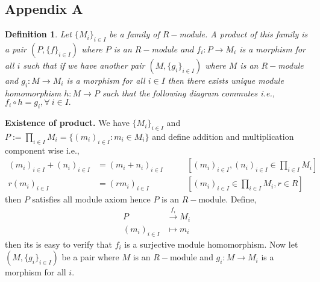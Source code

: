 \documentclass[11pt]{amsart}
\newtheorem{defn}[theorem]{Definition}
\begin{document}
\subsection{Appendix A}
\begin{defn}
Let $\{M_i\}_{i\in I}$ be a family of $R-$module. A product of this family is a pair $(P,\{f\}_{i\in I})$ where $P$ is an $R-$module and $f_i:P\to M_i$ is a morphism for all $i$ such that if we have another pair $(M,\{g_i\}_{i\in I})$ where $M$ is an $R-$module and $g_i:M\to M_i$ is a morphism for all $i\in I$ then there exists unique module homomorphism $h:M\to P$ such that the following diagram commutes i.e., $f_i\circ h=g_i,\forall~i\in I.$
\begin{center}
\end{center}
\end{defn}
\textbf{Existence of product.} We have $\{M_i\}_{i\in I}$ and $P:=\displaystyle\prod_{i\in I} M_i=\{(m_i)_{i\in I}:m_i\in M_i\}$ and define addition and multiplication component wise i.e., \begin{align*}
(m_i)_{i\in I}+(n_i)_{i\in I}&=(m_i+n_i)_{i\in I}\qquad&[(m_i)_{i\in I},(n_i)_{i\in I}\in \displaystyle\prod_{i\in I} M_i ]\\
r(m_i)_{i\in I}&= (rm_i)_{i\in I}\qquad&[(m_i)_{i\in I}\in \displaystyle\prod_{i\in I} M_i,r\in R]
\end{align*}
then $P$ satisfies all module axiom hence $P$ is an $R-$module. Define, \begin{align*}
P&\stackrel{f_i}{\longrightarrow}M_i\\
(m_i)_{i\in I}&\mapsto m_i
\end{align*}
then its is easy to verify that $f_i$ is a surjective module homomorphism. Now let $(M,\{g_i\}_{i\in I})$ be a pair where $M$ is an $R-$module and $g_i:M\to M_i$ is a morphism for all $i$.
\begin{center}
\end{center}
\end{document}
